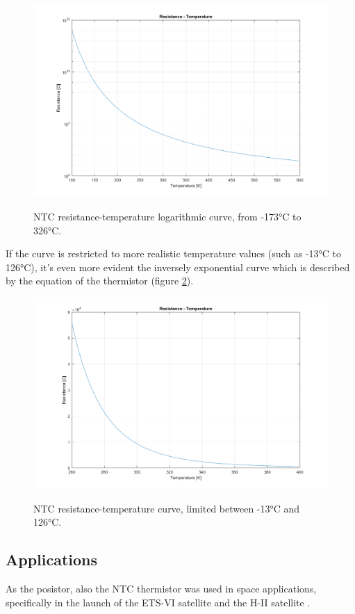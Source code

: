 \begin{figure}[h]
    \centering
    \includegraphics[width = .75\textwidth]{../res/plots/NTC_logarithmic.png}
    \label{fig:NTC_logarithmic}
    \caption{NTC resistance-temperature logarithmic curve, from -173°C to 326°C.}
\end{figure}

\FloatBarrier\noindent If the curve is restricted to more realistic temperature values (such as -13°C to 126°C), it's even more evident the inversely exponential curve which is described by the equation of the thermistor (figure \ref{fig:NTC_cartesian}).

\begin{figure}[h]
    \centering
    \includegraphics[width = .75\textwidth]{../res/plots/NTC_cartesian.png}
    \label{fig:NTC_cartesian}
    \caption{NTC resistance-temperature curve, limited between -13°C and 126°C.}
\end{figure}





\subsection{Applications}
As the posistor, also the NTC thermistor was used in space applications, specifically in the launch of the ETS-VI satellite and the H-II satellite \cite{Ishikawa1989116}.